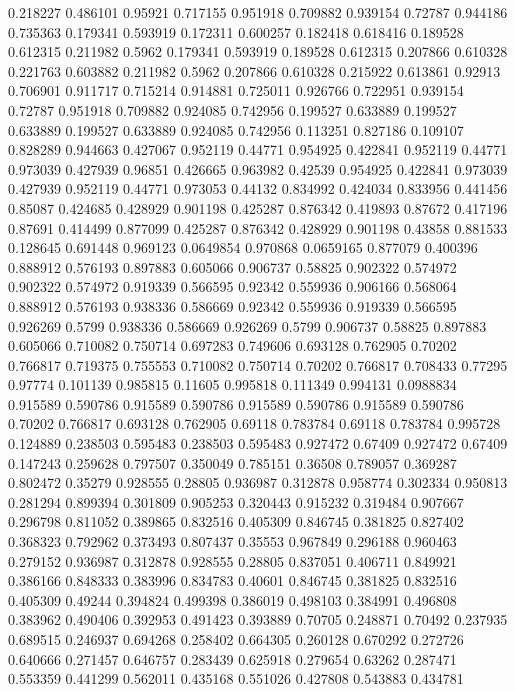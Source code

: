 0.218227 0.486101
0.95921 0.717155
0.951918 0.709882
0.939154 0.72787
0.944186 0.735363
0.179341 0.593919
0.172311 0.600257
0.182418 0.618416
0.189528 0.612315
0.211982 0.5962
0.179341 0.593919
0.189528 0.612315
0.207866 0.610328
0.221763 0.603882
0.211982 0.5962
0.207866 0.610328
0.215922 0.613861
0.92913 0.706901
0.911717 0.715214
0.914881 0.725011
0.926766 0.722951
0.939154 0.72787
0.951918 0.709882
0.924085 0.742956
0.199527 0.633889
0.199527 0.633889
0.199527 0.633889
0.924085 0.742956
0.113251 0.827186
0.109107 0.828289
0.944663 0.427067
0.952119 0.44771
0.954925 0.422841
0.952119 0.44771
0.973039 0.427939
0.96851 0.426665
0.963982 0.42539
0.954925 0.422841
0.973039 0.427939
0.952119 0.44771
0.973053 0.44132
0.834992 0.424034
0.833956 0.441456
0.85087 0.424685
0.428929 0.901198
0.425287 0.876342
0.419893 0.87672
0.417196 0.87691
0.414499 0.877099
0.425287 0.876342
0.428929 0.901198
0.43858 0.881533
0.128645 0.691448
0.969123 0.0649854
0.970868 0.0659165
0.877079 0.400396
0.888912 0.576193
0.897883 0.605066
0.906737 0.58825
0.902322 0.574972
0.902322 0.574972
0.919339 0.566595
0.92342 0.559936
0.906166 0.568064
0.888912 0.576193
0.938336 0.586669
0.92342 0.559936
0.919339 0.566595
0.926269 0.5799
0.938336 0.586669
0.926269 0.5799
0.906737 0.58825
0.897883 0.605066
0.710082 0.750714
0.697283 0.749606
0.693128 0.762905
0.70202 0.766817
0.719375 0.755553
0.710082 0.750714
0.70202 0.766817
0.708433 0.77295
0.97774 0.101139
0.985815 0.11605
0.995818 0.111349
0.994131 0.0988834
0.915589 0.590786
0.915589 0.590786
0.915589 0.590786
0.915589 0.590786
0.70202 0.766817
0.693128 0.762905
0.69118 0.783784
0.69118 0.783784
0.995728 0.124889
0.238503 0.595483
0.238503 0.595483
0.927472 0.67409
0.927472 0.67409
0.147243 0.259628
0.797507 0.350049
0.785151 0.36508
0.789057 0.369287
0.802472 0.35279
0.928555 0.28805
0.936987 0.312878
0.958774 0.302334
0.950813 0.281294
0.899394 0.301809
0.905253 0.320443
0.915232 0.319484
0.907667 0.296798
0.811052 0.389865
0.832516 0.405309
0.846745 0.381825
0.827402 0.368323
0.792962 0.373493
0.807437 0.35553
0.967849 0.296188
0.960463 0.279152
0.936987 0.312878
0.928555 0.28805
0.837051 0.406711
0.849921 0.386166
0.848333 0.383996
0.834783 0.40601
0.846745 0.381825
0.832516 0.405309
0.49244 0.394824
0.499398 0.386019
0.498103 0.384991
0.496808 0.383962
0.490406 0.392953
0.491423 0.393889
0.70705 0.248871
0.70492 0.237935
0.689515 0.246937
0.694268 0.258402
0.664305 0.260128
0.670292 0.272726
0.640666 0.271457
0.646757 0.283439
0.625918 0.279654
0.63262 0.287471
0.553359 0.441299
0.562011 0.435168
0.551026 0.427808
0.543883 0.434781
